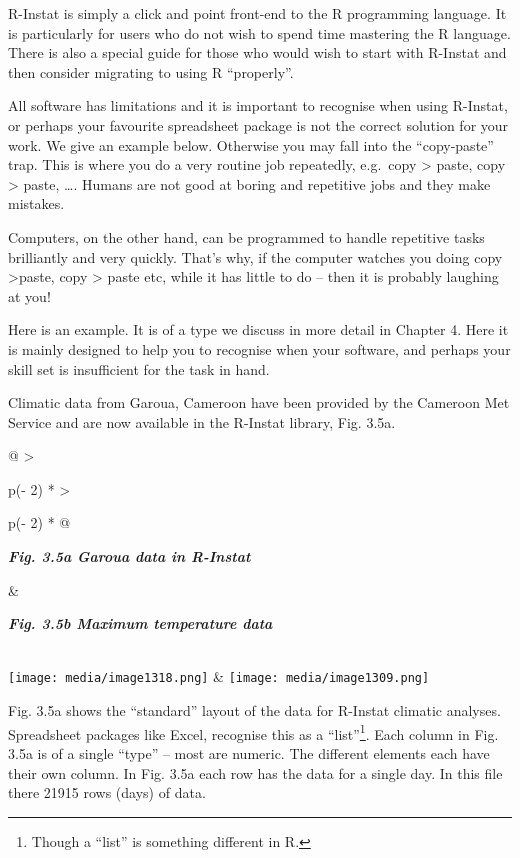 \documentclass[
  letterpaper,
  DIV=11,
  numbers=noendperiod]{scrreprt}
\begin{document}
R-Instat is simply a click and point front-end to the R programming
language. It is particularly for users who do not wish to spend time
mastering the R language. There is also a special guide for those who
would wish to start with R-Instat and then consider migrating to using R
``properly''.

All software has limitations and it is important to recognise when using
R-Instat, or perhaps your favourite spreadsheet package is not the
correct solution for your work. We give an example below. Otherwise you
may fall into the ``copy-paste'' trap. This is where you do a very
routine job repeatedly, e.g.~copy \textgreater{} paste, copy
\textgreater{} paste, \ldots. Humans are not good at boring and
repetitive jobs and they make mistakes.

Computers, on the other hand, can be programmed to handle repetitive
tasks brilliantly and very quickly. That's why, if the computer watches
you doing copy \textgreater paste, copy \textgreater{} paste etc, while
it has little to do -- then it is probably laughing at you!

Here is an example. It is of a type we discuss in more detail in Chapter
4. Here it is mainly designed to help you to recognise when your
software, and perhaps your skill set is insufficient for the task in
hand.

Climatic data from Garoua, Cameroon have been provided by the Cameroon
Met Service and are now available in the R-Instat library, Fig. 3.5a.

\begin{longtable}[]{@{}
  >{\raggedright\arraybackslash}p{(\columnwidth - 2\tabcolsep) * }
  >{\raggedright\arraybackslash}p{(\columnwidth - 2\tabcolsep) * }@{}}
\toprule\noalign{}
\begin{minipage}[b]{\linewidth}\raggedright
\textbf{\emph{Fig. 3.5a Garoua data in R-Instat}}
\end{minipage} & \begin{minipage}[b]{\linewidth}\raggedright
\textbf{\emph{Fig. 3.5b Maximum temperature data}}
\end{minipage} \\
\midrule\noalign{}
\endhead
\bottomrule\noalign{}
\endlastfoot
\texttt{[image: media/image1318.png]}
&
\texttt{[image: media/image1309.png]} \\
\end{longtable}

Fig. 3.5a shows the ``standard'' layout of the data for R-Instat
climatic analyses. Spreadsheet packages like Excel, recognise this as a
``list''\footnote{Though a ``list'' is something different in R.}. Each
column in Fig. 3.5a is of a single ``type'' -- most are numeric. The
different elements each have their own column. In Fig. 3.5a each row has
the data for a single day. In this file there 21915 rows (days) of data.
\end{document}
